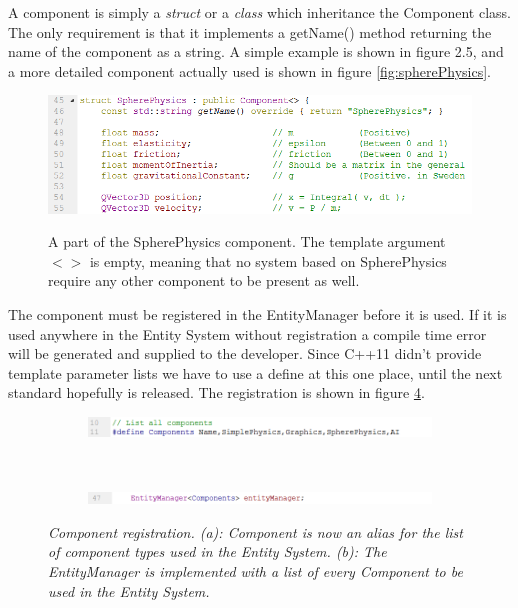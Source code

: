 A component is simply a \textit{struct} or a \textit{class} which inheritance the Component class. The only requirement is that it implements a getName() method returning the name of the component as a string. A simple example is shown in figure 2.5, and a more detailed component actually used is shown in figure \ref{fig:spherePhysics}.
\begin{figure}[H]
  \centering
  \includegraphics[width=0.9\linewidth]{images/SpherePhysicsPartExample.png}
  \label{fig:spherePhysicsPart}
  \caption{A part of the SpherePhysics component. The template argument \textit{$<>$} is empty, meaning that no system based on SpherePhysics require any other component to be present as well.}
\end{figure}
The component must be registered in the EntityManager before it is used. If it is used anywhere in the Entity System without registration a compile time error will be generated and supplied to the developer. Since C++11 didn't provide template parameter lists we have to use a define at this one place, until the next standard hopefully is released. The registration is shown in figure \ref{fig:entityInitializationExample}.
\begin{figure}[H]
\begin{subfigure}{\textwidth}
  \centering
  \includegraphics[width=0.9\linewidth]{images/componentList.png}
  \caption{}
  \label{fig:componentListExample}
\end{subfigure}%
\\
\begin{subfigure}{\textwidth}
  \centering
  \includegraphics[width=0.9\linewidth]{images/entityManagerInstanciation.png}
  \caption{}
  \label{fig:entityManagerInstanciation}
\end{subfigure}
\caption[Ground textures]{\textit{Component registration. (a): Component is now an alias for the list of component types used in the Entity System. (b): The EntityManager is implemented with a list of every Component to be used in the Entity System.}}
\label{fig:entityInitializationExample}
\end{figure}
